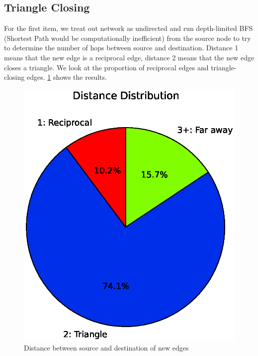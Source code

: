 \documentclass[10pt]{article}
\begin{document}
\begin{multicols}{2}
\subsection{Triangle Closing}
For the first item, we treat out network as undirected and run depth-limited BFS (Shortest Path would be computationally inefficient) from the source node to try to determine the number of hops between source and destination. Distance 1 means that the new edge is a reciprocal edge, distance 2 means that the new edge closes a triangle. We look at the proportion of reciprocal edges and triangle-closing edges. \ref{fig:portion123} shows the results.
\begin{figure}[H]
    \centering
    \includegraphics[scale=0.4]{./graphs/distance_pie.eps}
    \caption{Distance between source and destination of new edges} \label{fig:portion123}
\end{figure}


\end{multicols}
\end{document}

